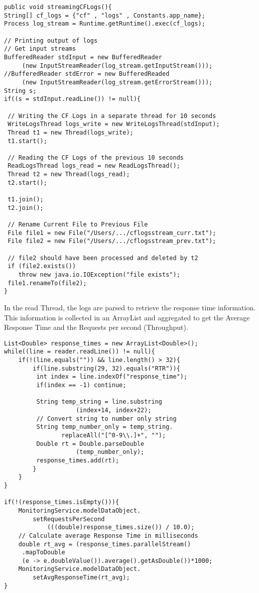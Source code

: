 \documentclass[article,type=msc,colorback,12pt,accentcolor=tud7b,table]{tudthesis}
\begin{document}
\begin{itemize}
\begin{lstlisting}
public void streamingCFLogs(){
String[] cf_logs = {"cf" , "logs" , Constants.app_name};
Process log_stream = Runtime.getRuntime().exec(cf_logs);

// Printing output of logs
// Get input streams
BufferedReader stdInput = new BufferedReader
	 (new InputStreamReader(log_stream.getInputStream()));
//BufferedReader stdError = new BufferedReaded
	 (new InputStreamReader(log_stream.getErrorStream()));
String s; 
if((s = stdInput.readLine()) != null){

 // Writing the CF Logs in a separate thread for 10 seconds
 WriteLogsThread logs_write = new WriteLogsThread(stdInput);
 Thread t1 = new Thread(logs_write);
 t1.start(); 

 // Reading the CF Logs of the previous 10 seconds
 ReadLogsThread logs_read = new ReadLogsThread();
 Thread t2 = new Thread(logs_read);
 t2.start();

 t1.join();
 t2.join();

 // Rename Current File to Previous File
 File file1 = new File("/Users/.../cflogsstream_curr.txt");
 File file2 = new File("/Users/.../cflogsstream_prev.txt");

 // file2 should have been processed and deleted by t2
 if (file2.exists())		
	throw new java.io.IOException("file exists");
 file1.renameTo(file2);
}          
\end{lstlisting}
In the read Thread, the logs are parsed to retrieve the response time information. This information is collected in an ArrayList and aggregated to get the Average Response Time and the Requests per second (Throughput). 
\begin{lstlisting}
List<Double> response_times = new ArrayList<Double>();
while((line = reader.readLine()) != null){				
	if(!(line.equals("")) && line.length() > 32){
		if(line.substring(29, 32).equals("RTR")){
		 int index = line.indexOf("response_time");
		 if(index == -1) continue;

		 String temp_string = line.substring
					(index+14, index+22);
		 // Convert string to number only string
		 String temp_number_only = temp_string.
				replaceAll("[^0-9\\.]+", "");		
		 Double rt = Double.parseDouble
					(temp_number_only);
		 response_times.add(rt);	
		}   
	}  
}

if(!(response_times.isEmpty())){
	MonitoringService.modelDataObject.
		setRequestsPerSecond
			(((double)response_times.size()) / 10.0);
	// Calculate average Response Time in milliseconds			
	double rt_avg = (response_times.parallelStream()
	 .mapToDouble
	 (e -> e.doubleValue()).average().getAsDouble())*1000;	
	MonitoringService.modelDataObject.
		setAvgResponseTime(rt_avg);	 	  
}


\end{lstlisting}
\end{itemize}
\end{document}
